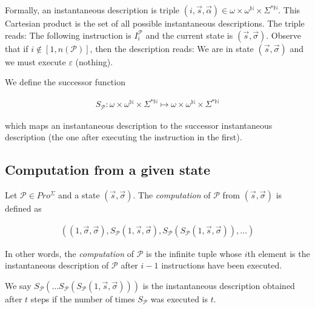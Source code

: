 \documentclass[a4paper, 12pt]{article}
\begin{document}
Formally, an instantaneous description is triple $(i, \overrightarrow{s},
\overrightarrow{\alpha}) \in \omega \times \omega^{\mathbb{N}} \times
\Sigma^{*\mathbb{N}}$. This Cartesian product is the set of all possible
instantaneous descriptions. The triple reads: The following instruction is
$I_{i}^{\mathcal{P}}$ and the current state is $(\overrightarrow{s},
\overrightarrow{\sigma})$. Observe that if $i \not\in [1, n(\mathcal{P})]$, then
the description reads: We are in state $(\overrightarrow{s},
\overrightarrow{\sigma})$ and we must execute $\varepsilon$ (nothing).

We define the successor function

\begin{align*}
    S_\mathcal{P} : \omega \times \omega^{\mathbb{N}} \times
    \Sigma^{*\mathbb{N}} \mapsto  \omega \times \omega^{\mathbb{N}} \times \Sigma^{*\mathbb{N}}
\end{align*}

which maps an instantaneous description to the successor instantaneous
description (the one after executing the instruction in the first). 

\subsection{Computation from a given state}

Let $\mathcal{P} \in Pro^{\Sigma}$ and a state  $(\overrightarrow{s},
\overrightarrow{\sigma})$. The \textit{computation} of $\mathcal{P}$ from
$(\overrightarrow{s}, \overrightarrow{\sigma})$ is defined as 

\begin{align*}
    \left(  (1, \overrightarrow{\sigma}, \overrightarrow{\sigma}),
    S_{\mathcal{P}}\left( 1, \overrightarrow{s}, \overrightarrow{\sigma}
\right), S_{\mathcal{P}} \left( S_{\mathcal{P}} \left( 1, \overrightarrow{s},
\overrightarrow{\sigma} \right)  \right), \ldots   \right) 
\end{align*}

In other words, the \textit{computation} of $\mathcal{P}$ is the infinite tuple
whose $i$th element is the instantaneous description of $\mathcal{P}$ after $i -
1$ instructions have been executed.

We say $S_{\mathcal{P}} \left( \ldots S_{\mathcal{P}} \left(
S_{\mathcal{P}}\left( 1, \overrightarrow{s}, \overrightarrow{\sigma} \right)
\right)  \right) $ is the instantaneous description obtained after $t$ steps if
the number of times $S_{\mathcal{P}}$ was executed is $t$.
\end{document}
